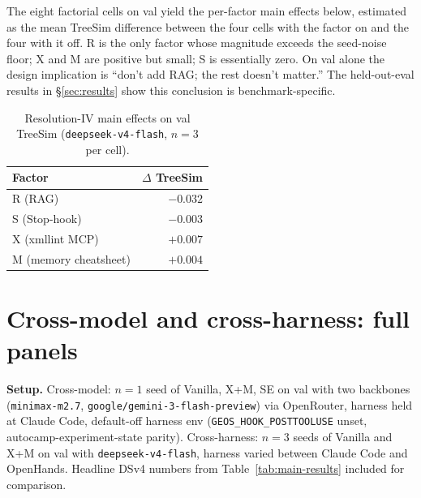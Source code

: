 \documentclass{article}
\begin{document}
The eight factorial cells on val yield the per-factor main effects below, estimated as the mean TreeSim difference between the four cells with the factor on and the four with it off. R is the only factor whose magnitude exceeds the seed-noise floor; X and M are positive but small; S is essentially zero. On val alone the design implication is ``don't add RAG; the rest doesn't matter.'' The held-out-eval results in \S\ref{sec:results} show this conclusion is benchmark-specific.

\begin{table}[h]
  \caption{Resolution-IV main effects on val TreeSim (\texttt{deepseek-v4-flash}, $n=3$ per cell).}
  \label{tab:main-effects}
  \centering
  \small
  \begin{tabular}{lr}
    \toprule
    \textbf{Factor} & \textbf{$\Delta$ TreeSim} \\
    \midrule
    R (RAG)                & $-0.032$ \\
    S (Stop-hook)          & $-0.003$ \\
    X (xmllint MCP)        & $+0.007$ \\
    M (memory cheatsheet)  & $+0.004$ \\
    \bottomrule
  \end{tabular}
\end{table}

\section{Cross-model and cross-harness: full panels}
\label{app:cross-model-detail}
\label{app:cross-model}

\textbf{Setup.} Cross-model: $n=1$ seed of Vanilla, X+M, SE on val with two backbones (\texttt{minimax-m2.7}, \texttt{google/gemini-3-flash-preview}) via OpenRouter, harness held at Claude Code, default-off harness env (\texttt{GEOS\_HOOK\_POSTTOOLUSE} unset, autocamp-experiment-state parity). Cross-harness: $n=3$ seeds of Vanilla and X+M on val with \texttt{deepseek-v4-flash}, harness varied between Claude Code and OpenHands. Headline DSv4 numbers from Table~\ref{tab:main-results} included for comparison.
\end{document}
